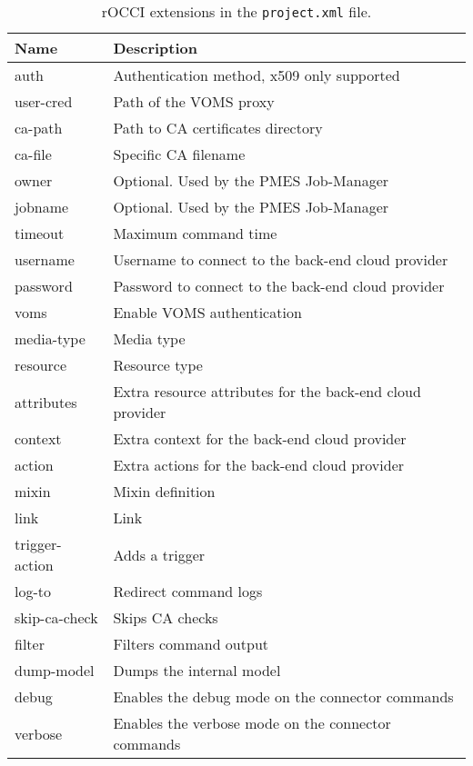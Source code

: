 \begin{table}[!ht]
\def\arraystretch{1.2}
\centering
\begin{tabularx}{\linewidth}{|l|X|} \hline
	\textbf{Name} &\textbf{Description} \\ \hline
	auth		& Authentication method, x509 only supported \\ \hline
	user-cred	& Path of the VOMS proxy \\ \hline
	ca-path		& Path to CA certificates directory \\ \hline
	ca-file		& Specific CA filename \\ \hline
	owner		& Optional. Used by the PMES Job-Manager \\ \hline
	jobname		& Optional. Used by the PMES Job-Manager \\ \hline
	timeout		& Maximum command time \\ \hline
	username	& Username to connect to the back-end cloud provider \\ \hline
	password	& Password to connect to the back-end cloud provider \\ \hline
	voms		& Enable VOMS authentication \\ \hline
	media-type	& Media type \\ \hline
	resource	& Resource type \\ \hline
	attributes	& Extra resource attributes for the back-end cloud provider \\ \hline
	context		& Extra context for the back-end cloud provider \\ \hline
	action		& Extra actions for the back-end cloud provider \\ \hline
	mixin		& Mixin definition \\ \hline
	link		& Link \\ \hline
	trigger-action	& Adds a trigger \\ \hline
	log-to		& Redirect command logs \\ \hline
	skip-ca-check	& Skips CA checks \\ \hline
	filter		& Filters command output \\ \hline
	dump-model	& Dumps the internal model \\ \hline
	debug		& Enables the debug mode on the connector commands \\ \hline
	verbose		& Enables the verbose mode on the connector commands \\ \hline
\end{tabularx}
\caption{rOCCI extensions in the \texttt{project.xml} file.}
\label{tab:rOCCI_extensions}
\end{table}

